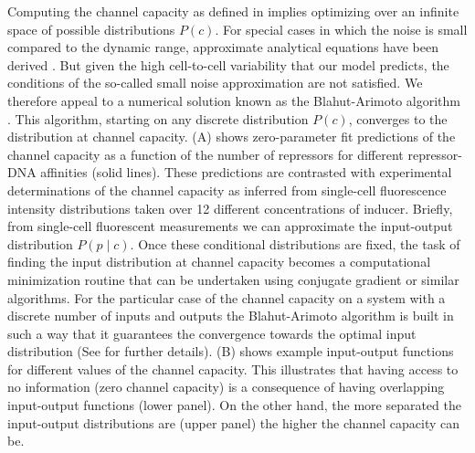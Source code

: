 Computing the channel capacity as defined in  implies
optimizing over an infinite space of possible distributions $P(c)$. For special
cases in which the noise is small compared to the dynamic range, approximate
analytical equations have been derived \cite{Tkacik2008a}. But given the high
cell-to-cell variability that our model predicts, the conditions of the
so-called small noise approximation are not satisfied. We therefore appeal to a
numerical solution known as the Blahut-Arimoto algorithm \cite{Blahut1972}.
This algorithm, starting on any discrete distribution $P(c)$, converges to
the distribution at channel capacity. (A) shows
zero-parameter fit predictions of the channel capacity as a function of the
number of repressors for different repressor-DNA affinities (solid lines).
These predictions are contrasted with experimental determinations of the
channel capacity as inferred from single-cell fluorescence intensity
distributions taken over 12 different concentrations of inducer. Briefly, from
single-cell fluorescent measurements we can approximate the input-output
distribution $P(p \mid c)$. Once these conditional distributions are fixed, the
task of finding the input distribution at channel capacity becomes a
computational minimization routine that can be undertaken using conjugate
gradient or similar algorithms. For the particular case of the channel capacity
on a system with a discrete number of inputs and outputs the Blahut-Arimoto
algorithm is built in such a way that it guarantees the convergence towards the
optimal input distribution (See  for further details).
(B) shows example input-output functions for different
values of the channel capacity. This illustrates that having access to no
information (zero channel capacity) is a consequence of having overlapping
input-output functions (lower panel). On the other hand, the more separated the
input-output distributions are (upper panel) the higher the channel capacity
can be.


